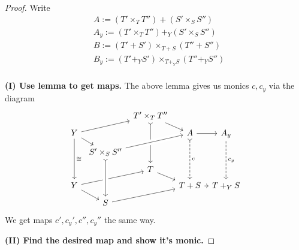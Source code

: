 \documentclass[12pt]{article}
\renewcommand{\(}{\left(}
\renewcommand{\)}{\right)}
\renewcommand{\{}{\left\lbrace}
\renewcommand{\}}{\right\rbrace}
\theoremstyle{remark}
\theoremstyle{definition}
\begin{document}
	\begin{proof}
		Write
		\begin{align*}
		&A := (T' \times_T T'') + (S'\times_SS'') \\
		&A_y  := (T' \times_T T'') +_Y (S'\times_SS'') \\
		&B  := (T'+S') \times_{T+S} (T''+S'') \\ 
		&B_y := (T'+_YS') \times_{T+_YS} (T''+_YS'') \\
		\end{align*}
		
		
		\textbf{(I) Use lemma to get maps.}  The above lemma gives us monics $c,c_y$ via the diagram
		\[
		\begin{tikzcd}[column sep=.5em,row sep=.5em]
		{} &
		{} &
		{T'\times_TT''} \ar[dr] \ar[ddd,rightarrowtail]&
		{} &
		{} \\
		{Y} \ar[rru] \ar[rd] \ar[ddd,"\cong"]&
		{} &
		{} &
		{A} \ar[ddd,dashed,rightarrowtail, "c"] \ar[r] &
		{A_y} \ar[ddd,dashed,"c_y"]\\
		{} &
		{S'\times_SS''} \ar[rru,crossing over] &
		{} &
		{} &
		{} \\
		{} &
		{} &
		{T} \ar[dr]&
		{} &
		{} \\
		{Y} \ar[rru] \ar[rd]&
		{} &
		{} &
		{T+S} \ar[r]&
		{T+_YS} \\
		{} &
		{S} \ar[rru] &
		{} &
		{} &
		{} 
		\ar[from=3-2,to=6-2,rightarrowtail,crossing over]
		\end{tikzcd}
		\]
		We get maps $c',c_y',c'',c_y''$ the same way.
		
		
		\textbf{(II) Find the desired map and show it's monic.} 
		

\end{proof}
\end{document}
